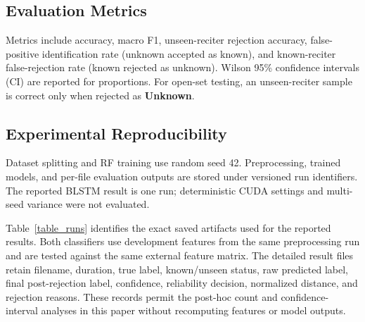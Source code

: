 \documentclass[a4paper,conference]{IEEEtran}
\begin{document}
\subsection{Evaluation Metrics}

Metrics include accuracy, macro F1, unseen-reciter rejection accuracy, false-positive identification rate (unknown accepted as known), and known-reciter false-rejection rate (known rejected as unknown). Wilson 95\% confidence intervals (CI) are reported for proportions. For open-set testing, an unseen-reciter sample is correct only when rejected as \textbf{Unknown}.

\subsection{Experimental Reproducibility}

Dataset splitting and RF training use random seed 42. Preprocessing, trained models, and per-file evaluation outputs are stored under versioned run identifiers. The reported BLSTM result is one run; deterministic CUDA settings and multi-seed variance were not evaluated.

Table~\ref{table_runs} identifies the exact saved artifacts used for the reported results. Both classifiers use development features from the same preprocessing run and are tested against the same external feature matrix. The detailed result files retain filename, duration, true label, known/unseen status, raw predicted label, final post-rejection label, confidence, reliability decision, normalized distance, and rejection reasons. These records permit the post-hoc count and confidence-interval analyses in this paper without recomputing features or model outputs.

\begin{table}[htbp]
\centering
\caption{Versioned artifacts underlying the reported evaluation.}
\label{table_runs}
\renewcommand{\arraystretch}{1.08}
\setlength{\tabcolsep}{3pt}
\end{table}
\end{document}
